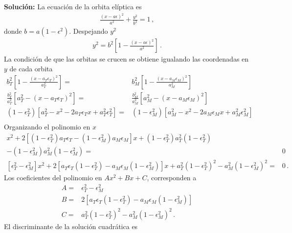 \textbf{Solución:}
La ecuación de la orbita elíptica  es
\begin{align}
  \label{eq:coli}
  \frac{(x-a\epsilon)^2}{a^2}+\frac{y^2}{b^2}=1\,,
\end{align}
donde $b=a(1-\epsilon^2)$. Despejando $y^2$
\begin{align}
  y^2=b^2\left[1-\frac{(x-a\epsilon)^2}{a^2}\right]\,.
\end{align}
La condición de que las orbitas se crucen se obtiene igualando las coordenadas en $y$ de cada orbita
\begin{align*}
  b^2_T\left[1-\frac{(x-a_T\epsilon_T)^2}{a_T^2}\right]=&
  b^2_M\left[1- \frac{(x-a_M\epsilon_M)^2}{a_M^2}\right]\nonumber\\
  \frac{b^2_T}{a_T^2}\left[a_T^2-(x-a_T\epsilon_T)^2\right]=&
  \frac{b^2_M}{a_M^2}\left[a_M^2-(x-a_M\epsilon_M)^2\right]\nonumber\\
  (1-\epsilon_T^2)\left[a_T^2-x^2-2a_T\epsilon_Tx+a_T^2\epsilon_T^2\right]=&
  (1-\epsilon_M^2)\left[a_M^2-x^2-2a_M\epsilon_Mx+a_M^2\epsilon_M^2\right]\nonumber\\
\end{align*}
Organizando el polinomio en $x$
\begin{align*}
  [-(1-\epsilon_T^2)+(1-\epsilon_M^2)]x^2+2[(1-\epsilon_T^2)a_T\epsilon_T-(1-\epsilon_M^2)a_M\epsilon_M] x+(1-\epsilon_T^2)a_T^2(1-\epsilon_T^2)\nonumber\\
-(1-\epsilon_M^2)a_M^2(1-\epsilon_M^2)=&0\nonumber\\
  [\epsilon_T^2-\epsilon_M^2]x^2+2[a_T\epsilon_T(1-\epsilon_T^2)-a_M\epsilon_M(1-\epsilon_M^2)] x+a_T^2(1-\epsilon_T^2)^2
-a_M^2(1-\epsilon_M^2)^2=&0\,.
\end{align*}
Los coeficientes del polinomio en $Ax^2+Bx+C$, corresponden a
\begin{align*}
  A=&\epsilon_T^2-\epsilon_M^2\nonumber\\
  B=&2[a_T\epsilon_T(1-\epsilon_T^2)-a_M\epsilon_M(1-\epsilon_M^2)]\nonumber\\
  C=&a_T^2(1-\epsilon_T^2)^2-a_M^2(1-\epsilon_M^2)^2\,.
\end{align*}
El discriminante de la solución cuadrática es
